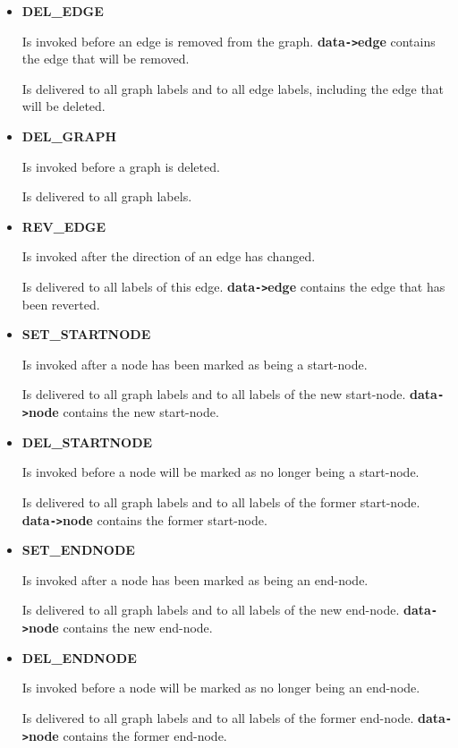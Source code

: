 \begin{itemize}
\begin{itemize}
  Is delivered to all graph labels and to all node labels,
  including the node that will be deleted.

\item{\bf DEL\_EDGE}
  
  Is invoked before an edge is removed from the graph. {\bf
    data\verb|->|edge} contains the edge that will be removed.
  
  Is delivered to all graph labels and to all edge labels,
  including the edge that will be deleted.

\item{\bf DEL\_GRAPH}
  
  Is invoked before a graph is deleted.
  
  Is delivered to all graph labels.

\item{\bf REV\_EDGE}
  
  Is invoked after the direction of an edge has changed.
  
  Is delivered to all labels of this edge. {\bf
    data\verb|->|edge} contains the edge that has been reverted.

\item{\bf SET\_STARTNODE}
  
  Is invoked after a node has been marked as being a start-node.
  
  Is delivered to all graph labels and to all labels of the new
  start-node.  {\bf data\verb|->|node} contains the new start-node.

\item{\bf DEL\_STARTNODE}
  
  Is invoked before a node will be marked as no longer being a
  start-node.
  
  Is delivered to all graph labels and to all labels of the
  former start-node.  {\bf data\verb|->|node} contains the former
  start-node.

\item{\bf SET\_ENDNODE}
  
  Is invoked after a node has been marked as being an end-node.
  
  Is delivered to all graph labels and to all labels of the new
  end-node.  {\bf data\verb|->|node} contains the new end-node.

\item{\bf DEL\_ENDNODE}
  
  Is invoked before a node will be marked as no longer being an
  end-node.
  
  Is delivered to all graph labels and to all labels of the
  former end-node.  {\bf data\verb|->|node} contains the former
  end-node.


\end{itemize}
\end{itemize}
